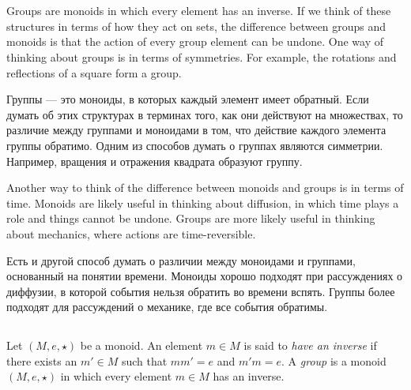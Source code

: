 \documentclass[../main/CT4S-EN-RU]{subfiles}
\begin{document}
\section{}\label{sec:groups}

\begin{blockENG}
Groups are monoids in which every element has an inverse. If we think of these structures in terms of how they act on sets, the difference between groups and monoids is that the action of every group element can be undone. One way of thinking about groups is in terms of symmetries. For example, the rotations and reflections of a square form a group. 
\end{blockENG}

\begin{blockRUS}
Группы — это моноиды, в которых каждый элемент имеет обратный. Если думать об этих структурах в терминах того, как они действуют на множествах, то различие между группами и моноидами в том, что действие каждого элемента группы обратимо. Одним из способов думать о группах являются симметрии. Например, вращения и отражения квадрата образуют группу. 
\end{blockRUS}

\begin{blockENG}
Another way to think of the difference between monoids and groups is in terms of time. Monoids are likely useful in thinking about diffusion, in which time plays a role and things cannot be undone. Groups are more likely useful in thinking about mechanics, where actions are time-reversible. 
\end{blockENG}

\begin{blockRUS}
Есть и другой способ думать о различии между моноидами и группами, основанный на понятии времени. Моноиды хорошо подходят при рассуждениях о диффузии, в которой события нельзя обратить во времени вспять. Группы более подходят для рассуждений о механике, где все события обратимы.
\end{blockRUS}


\subsection{}

\begin{definitionENG}\label{def:group}
Let $(M,e,{⋆})$ be a monoid. An element $m\in M$ is said to {\em have an inverse} if there exists an $m'\in M$ such that $mm'=e$ and $m'm=e.$ A {\em group} is a monoid $(M,e,{⋆})$ in which every element $m\in M$ has an inverse.
\end{definitionENG}
\end{document}
